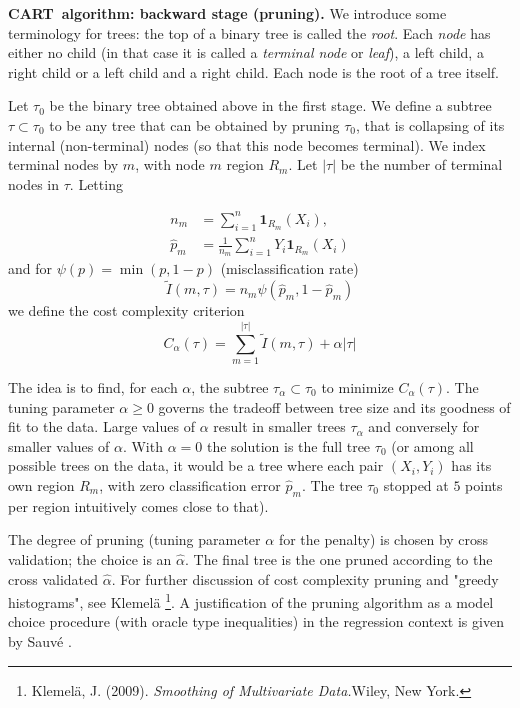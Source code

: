 \documentclass[11pt,twoside]{article}%
\theoremstyle{change}
\begin{document}
\bigskip

\textbf{CART\ algorithm: backward stage (pruning). }We introduce some
terminology for trees: the top of a binary tree is called the \textit{root}.
Each \textit{node} has either no child (in that case it is called a
\textit{terminal node} or \textit{leaf}), a left child, a right child or a
left child and a right child. Each node is the root of a tree itself.

Let $\tau_{0}$ be the binary tree obtained above in the first stage. We define
a subtree $\tau\subset\tau_{0}$ to be any tree that can be obtained by pruning
$\tau_{0}$, that is collapsing of its internal (non-terminal) nodes (so that
this node becomes terminal). We index terminal nodes by $m$, with node $m$
region $R_{m}$. Let $\left\vert \tau\right\vert $ be the number of terminal
nodes in $\tau$. Letting%

\begin{align*}
n_{m}  & =\sum_{i=1}^{n}\mathbf{1}_{R_{m}}(X_{i}),\\
\hat{p}_{m}  & =\frac{1}{n_{m}}\sum_{i=1}^{n}Y_{i}\mathbf{1}_{R_{m}}(X_{i})
\end{align*}
and for $\psi(p)=\min(p,1-p)$ (misclassification rate)%
\[
\tilde{I}(m,\tau)=n_{m}\psi\left(  \hat{p}_{m},1-\hat{p}_{m}\right)
\]
we define the cost complexity criterion
\[
C_{\alpha}(\tau)=\sum_{m=1}^{\left\vert \tau\right\vert }\tilde{I}%
(m,\tau)+\alpha\left\vert \tau\right\vert
\]


The idea is to find, for each $\alpha$, the subtree $\tau_{\alpha}\subset
\tau_{0}$ to minimize $C_{\alpha}(\tau)$. The tuning parameter $\alpha\geq0$
governs the tradeoff between tree size and its goodness of fit to the data.
Large values of $\alpha$ result in smaller trees $\tau_{\alpha}$ and
conversely for smaller values of $\alpha$. With $\alpha=0$ the solution is the
full tree $\tau_{0}$ (or among all possible trees on the data, it would be a
tree where each pair $(X_{i},Y_{i})$ has its own region $R_{m}$, with zero
classification error $\hat{p}_{m}$. The tree $\tau_{0}$ stopped at $5$ points
per region intuitively comes close to that).

The degree of pruning (tuning parameter $\alpha$ for the penalty) is chosen by
cross validation; the choice is an $\hat{\alpha}$. The final tree is the one
pruned according to the cross validated $\hat{\alpha}$. For further discussion
of cost complexity pruning and "greedy histograms", see Klemel\"{a}
\cite{Kl}\footnote{Klemel\"{a}, J. (2009). \textsl{Smoothing of Multivariate
Data.}Wiley, New York.}. A justification of the pruning algorithm as a model
choice procedure (with oracle type inequalities) in the regression context is
given by Sauv\'{e} \cite{sauv}.
\end{document}
